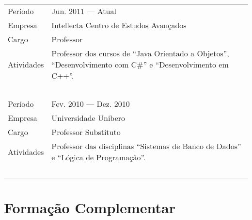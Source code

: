 \documentclass[a4paper, oneside, final]{scrartcl}
\begin{document}
\begin{tabularx}{0.97\linewidth}{p{2cm}X}
Período     & Jun. 2011 --- Atual \\
Empresa		& Intellecta Centro de Estudos Avançados \\
Cargo		& Professor \\
Atividades	& Professor dos cursos de ``Java Orientado a Objetos'', ``Desenvolvimento com C\#'' e ``Desenvolvimento em C++''. \\
			& \ \\

Período     & Fev. 2010 --- Dez. 2010 \\
Empresa     & Universidade Unibero \\
Cargo       & Professor Substituto \\
Atividades  & Professor das disciplinas ``Sistemas de Banco de Dados'' e ``Lógica de Programação''. \\
            & \ \\

\end{tabularx}

\section{Formação Complementar}
\end{document}
